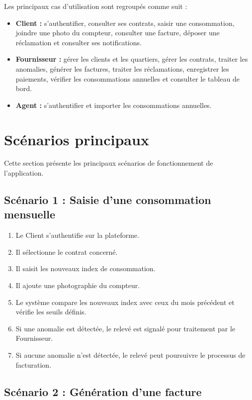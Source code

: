 Les principaux cas d'utilisation sont regroupés comme suit :

\begin{itemize}[leftmargin=*]
    \item \textbf{Client :} s'authentifier, consulter ses contrats, saisir une consommation, joindre une photo du compteur, consulter une facture, déposer une réclamation et consulter ses notifications.
    \item \textbf{Fournisseur :} gérer les clients et les quartiers, gérer les contrats, traiter les anomalies, générer les factures, traiter les réclamations, enregistrer les paiements, vérifier les consommations annuelles et consulter le tableau de bord.
    \item \textbf{Agent :} s'authentifier et importer les consommations annuelles.
\end{itemize}

\section{Scénarios principaux}

Cette section présente les principaux scénarios de fonctionnement de l'application.

\subsection*{Scénario 1 : Saisie d'une consommation mensuelle}

\begin{enumerate}[leftmargin=*]
    \item Le Client s'authentifie sur la plateforme.
    \item Il sélectionne le contrat concerné.
    \item Il saisit les nouveaux index de consommation.
    \item Il ajoute une photographie du compteur.
    \item Le système compare les nouveaux index avec ceux du mois précédent et vérifie les seuils définis.
    \item Si une anomalie est détectée, le relevé est signalé pour traitement par le Fournisseur.
    \item Si aucune anomalie n'est détectée, le relevé peut poursuivre le processus de facturation.
\end{enumerate}

\subsection*{Scénario 2 : Génération d'une facture}

